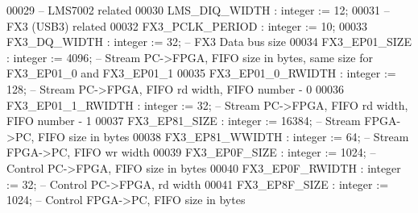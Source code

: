 \begin{DoxyCode}
00029 \textcolor{keyword}{      -- LMS7002 related }
00030       \textcolor{vhdlchar}{LMS_DIQ_WIDTH}           \textcolor{vhdlchar}{:} \textcolor{comment}{integer} \textcolor{vhdlchar}{:=} \textcolor{vhdllogic}{}\textcolor{vhdllogic}{12};
00031 \textcolor{keyword}{      -- FX3 (USB3) related}
00032       \textcolor{vhdlchar}{FX3_PCLK_PERIOD}         \textcolor{vhdlchar}{:} \textcolor{comment}{integer} \textcolor{vhdlchar}{:=} \textcolor{vhdllogic}{}\textcolor{vhdllogic}{10};
00033       \textcolor{vhdlchar}{FX3_DQ_WIDTH}            \textcolor{vhdlchar}{:} \textcolor{comment}{integer} \textcolor{vhdlchar}{:=} \textcolor{vhdllogic}{}\textcolor{vhdllogic}{32};\textcolor{keyword}{     -- FX3 Data bus size}
00034       \textcolor{vhdlchar}{FX3_EP01_SIZE}           \textcolor{vhdlchar}{:} \textcolor{comment}{integer} \textcolor{vhdlchar}{:=} \textcolor{vhdllogic}{}\textcolor{vhdllogic}{4096};\textcolor{keyword}{   -- Stream PC->FPGA, FIFO size in bytes, same size for
       FX3\_EP01\_0 and FX3\_EP01\_1}
00035       \textcolor{vhdlchar}{FX3_EP01_0_RWIDTH}       \textcolor{vhdlchar}{:} \textcolor{comment}{integer} \textcolor{vhdlchar}{:=} \textcolor{vhdllogic}{}\textcolor{vhdllogic}{128};\textcolor{keyword}{     -- Stream PC->FPGA, FIFO rd width, FIFO number - 0}
00036       \textcolor{vhdlchar}{FX3_EP01_1_RWIDTH}       \textcolor{vhdlchar}{:} \textcolor{comment}{integer} \textcolor{vhdlchar}{:=} \textcolor{vhdllogic}{}\textcolor{vhdllogic}{32};\textcolor{keyword}{     -- Stream PC->FPGA, FIFO rd width, FIFO number - 1  }
00037       \textcolor{vhdlchar}{FX3_EP81_SIZE}           \textcolor{vhdlchar}{:} \textcolor{comment}{integer} \textcolor{vhdlchar}{:=} \textcolor{vhdllogic}{}\textcolor{vhdllogic}{16384};\textcolor{keyword}{  -- Stream FPGA->PC, FIFO size in bytes}
00038       \textcolor{vhdlchar}{FX3_EP81_WWIDTH}         \textcolor{vhdlchar}{:} \textcolor{comment}{integer} \textcolor{vhdlchar}{:=} \textcolor{vhdllogic}{}\textcolor{vhdllogic}{64};\textcolor{keyword}{     -- Stream FPGA->PC, FIFO wr width}
00039       \textcolor{vhdlchar}{FX3_EP0F_SIZE}           \textcolor{vhdlchar}{:} \textcolor{comment}{integer} \textcolor{vhdlchar}{:=} \textcolor{vhdllogic}{}\textcolor{vhdllogic}{1024};\textcolor{keyword}{   -- Control PC->FPGA, FIFO size in bytes}
00040       \textcolor{vhdlchar}{FX3_EP0F_RWIDTH}         \textcolor{vhdlchar}{:} \textcolor{comment}{integer} \textcolor{vhdlchar}{:=} \textcolor{vhdllogic}{}\textcolor{vhdllogic}{32};\textcolor{keyword}{     -- Control PC->FPGA, rd width}
00041       \textcolor{vhdlchar}{FX3_EP8F_SIZE}           \textcolor{vhdlchar}{:} \textcolor{comment}{integer} \textcolor{vhdlchar}{:=} \textcolor{vhdllogic}{}\textcolor{vhdllogic}{1024};\textcolor{keyword}{   -- Control FPGA->PC, FIFO size in bytes}

\end{DoxyCode}
